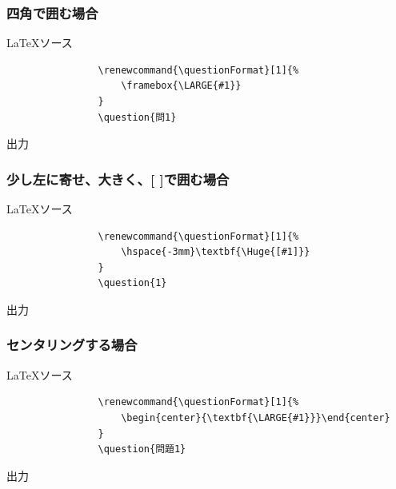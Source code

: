 \documentclass[dvipdfmx,a4j,11pt]{jarticle}
\newenvironment{inputbox}{%
	\begin{itembox}[r]{\LaTeX ソース}
}{
	\end{itembox}
}
\newenvironment{outputbox}{%
	\begin{itembox}[r]{出力}
}{%
	\end{itembox}
}
\begin{document}
	\subsubsection{四角で囲む場合}
		\begin{inputbox}
			\begin{verbatim}
				\renewcommand{\questionFormat}[1]{%
				    \framebox{\LARGE{#1}}
				}
				\question{問1}
			\end{verbatim}
		\end{inputbox}
		
		\renewcommand{\questionFormat}[1]{%
			\framebox{\LARGE{#1}}
		}
		\begin{outputbox}
		\end{outputbox}
		
	\subsubsection{少し左に寄せ、大きく、[ ]で囲む場合}
		\begin{inputbox}
			\begin{verbatim}
				\renewcommand{\questionFormat}[1]{%
				    \hspace{-3mm}\textbf{\Huge{[#1]}}
				}
				\question{1}
			\end{verbatim}
		\end{inputbox}
		\renewcommand{\questionFormat}[1]{%
			\hspace{-3mm}\textbf{\Huge{[#1]}}
		}

		\begin{outputbox}
		\end{outputbox}
			
	\subsubsection{センタリングする場合}
		\begin{inputbox}
			\begin{verbatim}
				\renewcommand{\questionFormat}[1]{%
				    \begin{center}{\textbf{\LARGE{#1}}}\end{center}
				}
				\question{問題1}
			\end{verbatim}
		\end{inputbox}

		\renewcommand{\questionFormat}[1]{%
			\begin{center}{\textbf{\LARGE{#1}}}\end{center}
		}
		\begin{outputbox}
		\end{outputbox}
			
\end{document}
